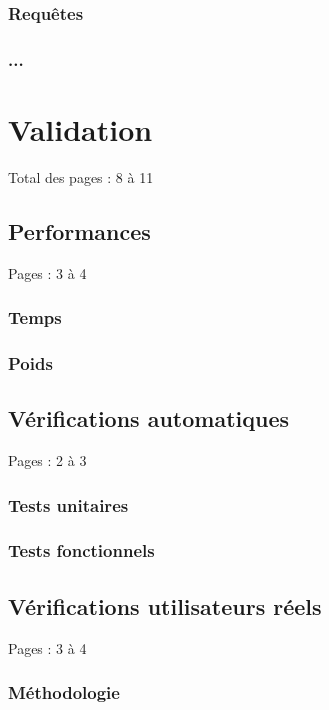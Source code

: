 \documentclass{eplmastersthesis_FR}
\begin{document}
			\subsection*{Requêtes}
			\subsection*{...}

	\chapter{Validation}

		Total des pages : 8 à 11

		\section{Performances}

			Pages : 3 à 4

			\subsection*{Temps}
			\subsection*{Poids}

		\section{Vérifications automatiques}

			Pages : 2 à 3

			\subsection*{Tests unitaires}
			\subsection*{Tests fonctionnels}

		\section{Vérifications utilisateurs réels}

			Pages : 3 à 4

			\subsection*{Méthodologie}
\end{document}
